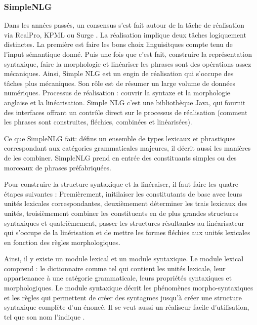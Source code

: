 \subsubsection{SimpleNLG}
 \citep{GattSimpleNLGRealisationEngine2009}
Dans les années passés, un consensus s'est fait autour de la tâche de réalisation via RealPro, KPML ou Surge . La réalisation implique deux tâches logiquement distinctes. La première est faire les bons choix linguisitques compte tenu de l'input sémantique donné. Puis une fois que c'est fait, construire la représentation syntaxique, faire la morphologie et linéariser les phrases sont des opérations assez mécaniques. Ainsi, Simple NLG est un engin de réalisation qui s'occupe des tâches plus mécaniques. Son rôle est de résumer un large volume de données numériques. Processus de réalisation : couvrir la syntaxe et la morphologie anglaise et la linéarisation. Simple NLG c'est une bibliothèque Java, qui fournit des interfaces offrant un contrôle direct sur le processus de réalisation (comment les phrases sont construites, fléchies, combinées et linéarisées).

Ce que SimpleNLG fait: défins un ensemble de types lexicaux et phrastiques correspondant aux catégories grammaticales majeures, il décrit aussi les manières de les combiner. SimpleNLG prend en entrée des constituants simples ou des morceaux de phrases préfabriquées.

Pour construire la structure syntaxique et la linéraiser, il faut faire les quatre étapes suivantes :
Premièrement, initilaiser les constitutants de base avec leurs unités lexicales correspondantes, deuxièmement déterminer les trais lexicaux des unités, troisièmement combiner les constituents en de plus grandes structures syntaxiques et quatrièmement, passer les structures résultantes au linéarisateur qui s'occupe de la linérisation et de mettre les formes fléchies aux unités lexicales en fonction des règles morphologiques.

Ainsi, il y existe un module lexical et un module syntaxique. Le module lexical comprend : le dictionnaire comme tel qui contient les unités lexicale, leur appartenance à une catégorie grammaticale, leurs propriétés syntaxiques et morphologiques. Le module syntaxique décrit les phénomènes morpho-syntaxiques et les règles qui permettent de créer des syntagmes jusqu'à créer une structure syntaxique complète d'un énoncé. Il se veut aussi un réaliseur facile d'utilisation, tel que son nom l'indique \citep{DaoustJSREALTextRealizer2015}.

